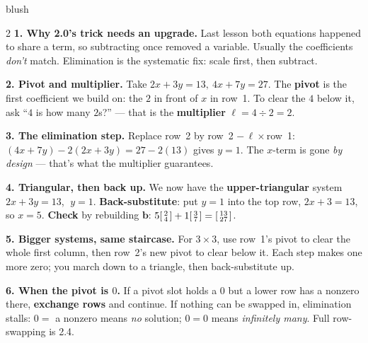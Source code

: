 \documentclass[10pt]{article}
\newcommand{\bb}{\mathbf{b}}
\begin{document}
\begin{skillbox}[Lesson]{blush}
\begin{multicols}{2}
\textbf{1. Why 2.0's trick needs an upgrade.} Last lesson both equations happened to share a term,
so subtracting once removed a variable. Usually the coefficients \emph{don't} match. Elimination
is the systematic fix: scale first, then subtract.

\textbf{2. Pivot and multiplier.} Take $2x+3y=13,\ 4x+7y=27$. The \textbf{pivot} is the first
coefficient we build on: the $2$ in front of $x$ in row~1. To clear the $4$ below it, ask ``$4$ is
how many $2$s?'' --- that is the \textbf{multiplier} $\ell=4\div2=2$.

\textbf{3. The elimination step.} Replace row~2 by row~2 $-\,\ell\times$row~1:
$(4x+7y)-2(2x+3y)=27-2(13)$ gives $y=1$. The $x$-term is gone \emph{by design} --- that's what the
multiplier guarantees.

\columnbreak

\textbf{4. Triangular, then back up.} We now have the \textbf{upper-triangular} system
$2x+3y=13$, $\;y=1$. \textbf{Back-substitute}: put $y=1$ into the top row, $2x+3=13$, so $x=5$.
\textbf{Check} by rebuilding $\bb$: $5\begin{bsmallmatrix} 2\\4 \end{bsmallmatrix}+1\begin{bsmallmatrix} 3\\7 \end{bsmallmatrix}=\begin{bsmallmatrix} 13\\27 \end{bsmallmatrix}$.

\textbf{5. Bigger systems, same staircase.} For $3\times 3$, use row~1's pivot to clear the whole
first column, then row~2's new pivot to clear below it. Each step makes one more zero; you march
down to a triangle, then back-substitute up.

\textbf{6. When the pivot is $0$.} If a pivot slot holds a $0$ but a lower row has a nonzero there,
\textbf{exchange rows} and continue. If nothing can be swapped in, elimination stalls: $0=$ a
nonzero means \emph{no} solution; $0=0$ means \emph{infinitely many}. Full row-swapping is 2.4.
\end{multicols}
\end{skillbox}
\end{document}
